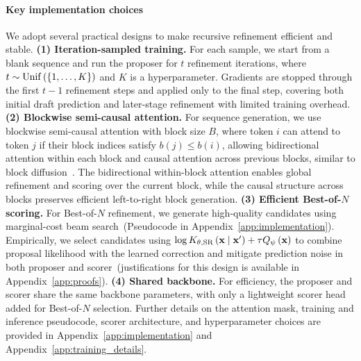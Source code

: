 \paragraph{Key implementation choices}
We adopt several practical designs to make recursive refinement efficient and stable. 
\textbf{(1) Iteration-sampled training.} For each sample, we start from a blank sequence and run the proposer for $t$ refinement iterations, where $t\sim\mathrm{Unif}\left(\left\{1,\ldots,K\right\}\right)$ and $K$ is a hyperparameter. 
Gradients are stopped through the first $t-1$ refinement steps and applied only to the final step, covering both initial draft prediction and later-stage refinement with limited training overhead. 
\textbf{(2) Blockwise semi-causal attention.} For sequence generation, we use blockwise semi-causal attention with block size $B$, where token $i$ can attend to token $j$ if their block indices satisfy $b(j)\le b(i)$, allowing bidirectional attention within each block and causal attention across previous blocks, similar to block diffusion~\citep{block_diffusion}. 
The bidirectional within-block attention enables global refinement and scoring over the current block, while the causal structure across blocks preserves efficient left-to-right block generation. 
\textbf{(3) Efficient Best-of-$N$ scoring.} For Best-of-$N$ refinement, we generate high-quality candidates using marginal-cost beam search~(Pseudocode in Appendix~\ref{app:implementation}). 
Empirically, we select candidates using $\log K_{\theta,\mathrm{SR}}\left(\mathbf{x}\mid\mathbf{x}'\right)+\tau Q_\psi\left(\mathbf{x}\right)$ to combine proposal likelihood with the learned correction and mitigate prediction noise in both proposer and scorer~(justifications for this design is available in Appendix~\ref{app:proofs}). 
\textbf{(4) Shared backbone.}
For efficiency, the proposer and scorer share the same backbone parameters, with only a lightweight scorer head added for Best-of-$N$ selection. 
Further details on the attention mask, training and inference pseudocode, scorer architecture, and hyperparameter choices are provided in Appendix~\ref{app:implementation} and Appendix~\ref{app:training_details}.

